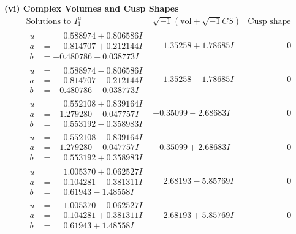 \documentclass[1p]{elsarticle_modified}
\theoremstyle{definition}
\newcommand{\I}{\sqrt{-1}}
\begin{document}
\newpage\flushleft \textbf{(vi) Complex Volumes and Cusp Shapes}
$$\begin{array}{c|c|c}  
\text{Solutions to }I^u_{1}& \I (\text{vol} + \sqrt{-1}CS) & \text{Cusp shape}\\
 \hline 
\begin{aligned}
u &= \phantom{-}0.588974 + 0.806586 I \\
a &= \phantom{-}0.814707 + 0.212144 I \\
b &= -0.480786 + 0.038773 I\end{aligned}
 & \phantom{-}1.35258 + 1.78685 I & \phantom{-0.000000 } 0 \\ \hline\begin{aligned}
u &= \phantom{-}0.588974 - 0.806586 I \\
a &= \phantom{-}0.814707 - 0.212144 I \\
b &= -0.480786 - 0.038773 I\end{aligned}
 & \phantom{-}1.35258 - 1.78685 I & \phantom{-0.000000 } 0 \\ \hline\begin{aligned}
u &= \phantom{-}0.552108 + 0.839164 I \\
a &= -1.279280 - 0.047757 I \\
b &= \phantom{-}0.553192 - 0.358983 I\end{aligned}
 & -0.35099 - 2.68683 I & \phantom{-0.000000 } 0 \\ \hline\begin{aligned}
u &= \phantom{-}0.552108 - 0.839164 I \\
a &= -1.279280 + 0.047757 I \\
b &= \phantom{-}0.553192 + 0.358983 I\end{aligned}
 & -0.35099 + 2.68683 I & \phantom{-0.000000 } 0 \\ \hline\begin{aligned}
u &= \phantom{-}1.005370 + 0.062527 I \\
a &= \phantom{-}0.104281 - 0.381311 I \\
b &= \phantom{-}0.61943 - 1.48558 I\end{aligned}
 & \phantom{-}2.68193 - 5.85769 I & \phantom{-0.000000 } 0 \\ \hline\begin{aligned}
u &= \phantom{-}1.005370 - 0.062527 I \\
a &= \phantom{-}0.104281 + 0.381311 I \\
b &= \phantom{-}0.61943 + 1.48558 I\end{aligned}
 & \phantom{-}2.68193 + 5.85769 I & \phantom{-0.000000 } 0 \\ \hline\begin{aligned}

\end{aligned}
\end{array}$$
\end{document}
